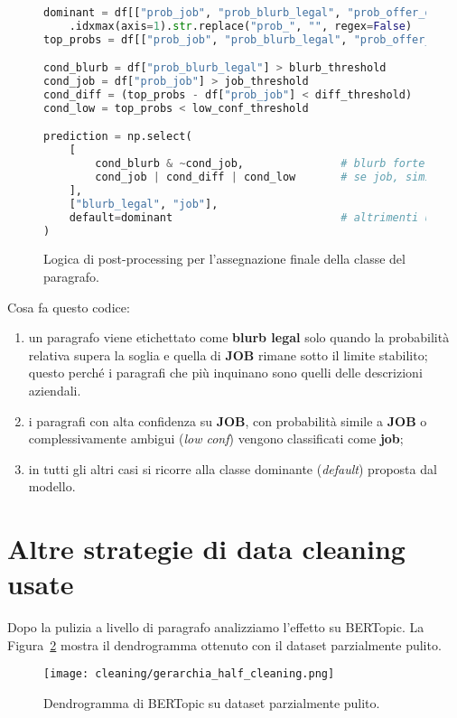 \begin{figure}[H]
    \centering
    \scriptsize
\begin{lstlisting}[language=python]
dominant = df[["prob_job", "prob_blurb_legal", "prob_offer_detail"]] \
    .idxmax(axis=1).str.replace("prob_", "", regex=False)
top_probs = df[["prob_job", "prob_blurb_legal", "prob_offer_detail"]].max(axis=1)

cond_blurb = df["prob_blurb_legal"] > blurb_threshold
cond_job = df["prob_job"] > job_threshold
cond_diff = (top_probs - df["prob_job"] < diff_threshold)
cond_low = top_probs < low_conf_threshold

prediction = np.select(
    [
        cond_blurb & ~cond_job,               # blurb forte e non job
        cond_job | cond_diff | cond_low       # se job, simile a job, o incerto
    ],
    ["blurb_legal", "job"],
    default=dominant                          # altrimenti usa la classe dominante
)
\end{lstlisting}
    \caption{Logica di post-processing per l'assegnazione finale della classe del paragrafo.}
    \label{fig:lr-postprocess}
\end{figure}

\noindent Cosa fa questo codice:
\begin{enumerate}
    \item un paragrafo viene etichettato come \textbf{blurb legal} solo quando la probabilità relativa supera la soglia e quella di \textbf{JOB} rimane sotto il limite stabilito; questo perché i paragrafi che più inquinano sono quelli delle descrizioni aziendali.
    \item i paragrafi con alta confidenza su \textbf{JOB}, con probabilità simile a \textbf{JOB} o complessivamente ambigui (\textit{low conf}) vengono classificati come \textbf{job};
    \item in tutti gli altri casi si ricorre alla classe dominante (\textit{default}) proposta dal modello.
\end{enumerate}
\section{Altre strategie di data cleaning usate}

\noindent Dopo la pulizia a livello di paragrafo analizziamo l'effetto su BERTopic. La Figura~\ref{fig:half-cleaning} mostra il dendrogramma ottenuto con il dataset parzialmente pulito.

\begin{figure}[H]
    \centering
    \texttt{[image: cleaning/gerarchia\_half\_cleaning.png]}
    \caption{Dendrogramma di BERTopic su dataset parzialmente pulito.}
    \label{fig:half-cleaning}
\end{figure}

